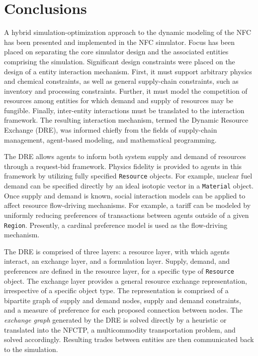 \section{Conclusions}

A hybrid simulation-optimization approach to the dynamic modeling of the NFC has
been presented and implemented in the \Cyclus NFC simulator. Focus has been
placed on separating the core simulator design and the associated entities
comprising the simulation. Significant design constraints were placed on the
design of a entity interaction mechanism. First, it must support arbitrary
physics and chemical constraints, as well as general supply-chain constraints,
such as inventory and processing constraints. Further, it must model the
competition of resources among entities for which demand and supply of resources
may be fungible. Finally, inter-entity interactions must be translated to the
interaction framework. The resulting interaction mechanism, termed the Dynamic
Resource Exchange (DRE), was informed chiefly from the fields of supply-chain
management, agent-based modeling, and mathematical programming.

The DRE allows agents to inform both system supply and demand of resources
through a request-bid framework. Physics fidelity is provided to agents in this
framework by utilizing fully specified \texttt{Resource} objects. For example,
nuclear fuel demand can be specified directly by an ideal isotopic vector in a
\texttt{Material} object. Once supply and demand is known, social interaction
models can be applied to affect resource flow-driving mechanisms. For example, a
tariff can be modeled by uniformly reducing preferences of transactions between
agents outside of a given \texttt{Region}. Presently, a cardinal preference
model is used as the flow-driving mechanism.

The DRE is comprised of three layers: a resource layer, with which agents
interact, an exchange layer, and a formulation layer. Supply, demand, and
preferences are defined in the resource layer, for a specific type of
\texttt{Resource} object. The exchange layer provides a general resource
exchange representation, irrespective of a specific object type. The
representation is comprised of a bipartite graph of supply and demand nodes,
supply and demand constraints, and a measure of preference for each proposed
connection between nodes. The \textit{exchange graph} generated by the DRE is
solved directly by a heuristic or translated into the NFCTP, a multicommodity
transportation problem, and solved accordingly. Resulting trades between
entities are then communicated back to the simulation.

